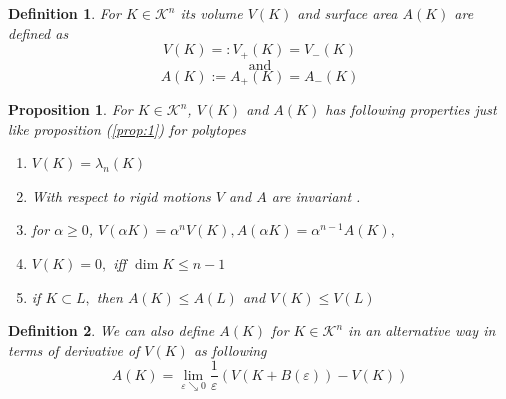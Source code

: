 \documentclass[oneside]{book}
\newtheorem{mydef}{Definition}[section]
\newtheorem{prop}{Proposition}
\begin{document}
	\begin{mydef} \label{d:16}
		For $K \in \mathcal{K}^n$ its volume $V(K) $ and surface area $A(K)$ are defined as 
		\[
		V(K) =: V_{+}(K)=V_{-}(K)
		\]
		$$\text{and} $$
		\[
		A(K) :=  A_{+}(K) = A_{-}(K) 
		\]
		
	\end{mydef}
	\begin{prop}
		
		For $ K \in \mathcal{K}^n $,  $V(K) $ and $A(K) $ has following properties just like proposition (\ref{prop:1}) for polytopes
		\begin{enumerate}
			\item  $V(K)=\lambda_{n}(K)$
			\item With respect to rigid motions $V$ and $A$ are invariant .
			\item  for $\alpha \geq 0$, $V(\alpha K)=\alpha^{n} V(K), A(\alpha K)=\alpha^{n-1} A(K),$ 
			\item $V(K)=0,$ iff $\operatorname{dim} K \leq n-1$
			\item if $K \subset L,$ then  $A(K) \leq A(L)$ and $V(K) \leq V(L)$
		\end{enumerate}
	\end{prop}
	\begin{mydef} \label{d:17}
		We can also define $A(K)$ for $K \in \mathcal{K}^n$ in an alternative way in terms of derivative of $V(K)$ as following \\
		\begin{equation}
		\label{eq48}
		A(K)=\lim _{\varepsilon \searrow 0} \frac{1}{\varepsilon}(V(K+B(\varepsilon))-V(K))
		\end{equation}
	\end{mydef}
	
	
\end{document}
